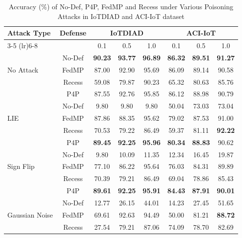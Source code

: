 \begin{table}[h!]
    \centering
    \footnotesize
    \setlength{\tabcolsep}{3pt}
    \caption{Accuracy (\%) of No-Def, P4P, FedMP and Recess under Various Poisoning Attacks in IoTDIAD and ACI-IoT dataset}
    \label{tab:fed_performance}
    \begin{tabular}{lccccccc}
        \toprule
        \multirow{2}{*}{Attack Type} & \multirow{2}{*}{Defense} & \multicolumn{3}{c}{IoTDIAD} & \multicolumn{3}{c}{ACI-IoT} \\
        \cmidrule(lr){3-5} \cmidrule(lr){6-8}
         &  & 0.1 & 0.5 & 1.0 & 0.1 & 0.5 & 1.0 \\
        \midrule
        \multirow{3}{*}{No Attack} 
         & No-Def & \textbf{90.23} & \textbf{93.77} & \textbf{96.89} & \textbf{86.32} & \textbf{89.51} & \textbf{91.27} \\
         & FedMP  & 87.00 & 92.90 & 95.69 & 86.09 & 89.14 & 90.58 \\
         & Recess & 59.08 & 79.87 & 90.23 & 65.32 & 80.63 & 85.76 \\
         & P4P    & 87.55 & 92.76 & 95.85 & 86.12 & 88.98 & 90.79 \\
        \midrule
        \multirow{3}{*}{LIE} 
         & No-Def & 9.80 & 9.80 & 9.80 & 50.04 & 73.03 & 73.04 \\
         & FedMP & 87.86 & 88.35 & 95.62 & 79.02 & 87.53 & 91.00 \\
         & Recess & 70.53 & 79.22 & 86.49 & 59.37 & 81.11 & \textbf{92.22} \\
         & P4P & \textbf{89.45} & \textbf{92.25} & \textbf{95.96} & \textbf{80.34} & \textbf{88.83} & 90.62 \\
         \midrule
        \multirow{3}{*}{Sign Flip} 
         & No-Def & 9.80 & 10.09 & 11.35 & 12.34 & 16.45 & 19.87 \\
         & FedMP & 77.10 & 86.22 & 95.64 & 76.03 & 84.31 & 89.89 \\
         & Recess & 70.39 & 79.21 & 86.49 & 69.04 & 78.86 & 85.43 \\
         & P4P & \textbf{89.61} & \textbf{92.25} & \textbf{95.91} & \textbf{84.43} & \textbf{87.91} & \textbf{90.01} \\
        \midrule
        \multirow{3}{*}{Gaussian Noise} 
         & No-Def & 12.77 & 26.15 & 44.01 & 14.23 & 27.45 & 51.65 \\
         & FedMP & 69.61 & 92.63 & 94.49 & 50.00 & 81.21 & \textbf{88.72} \\
         & Recess & 27.54 & 79.21 & 87.06 & 74.09 & 78.70 & 82.69 \\

\end{tabular}
\end{table}

